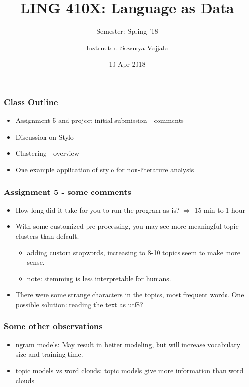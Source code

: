 \documentclass{beamer}
\author[Sowmya Vajjala]{Instructor: Sowmya Vajjala}
\title[LING 410X]{LING 410X: Language as Data}
\subtitle{Semester: Spring '18}
\date{10 Apr 2018}
\institute{Iowa State University, USA}
\begin{document}
\begin{frame}\titlepage
\end{frame}

\begin{frame}
\frametitle{Class Outline}
\begin{itemize}
\item Assignment 5 and project initial submission - comments
\item Discussion on Stylo
\item Clustering - overview
\item One example application of stylo for non-literature analysis
\end{itemize}
\end{frame}


\begin{frame}
\frametitle{Assignment 5 - some comments}
\begin{itemize}
\item How long did it take for you to run the program as is?
$\Rightarrow$ 15 min to 1 hour \pause
\item With some customized pre-processing, you may see more meaningful topic clusters than default.
\begin{itemize}
\item adding custom stopwords, increasing to 8-10 topics seem to make more sense.
\item note: stemming is less interpretable for humans.
\end{itemize} \pause 
\item There were some strange characters in the topics, most frequent words. One possible solution: reading the text as utf8?
\end{itemize}
\end{frame}

\begin{frame}
\frametitle{Some other observations}
\begin{itemize}
\item ngram models: May result in better modeling, but will increase vocabulary size and training time. \pause
\item topic models vs word clouds: topic models give more information than word clouds \pause
\end{itemize}
\end{frame}
\end{document}
